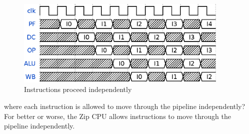 \documentclass{gqtekspec}
\begin{document}
\begin{itemize}
\begin{figure}\begin{center}
\includegraphics[width=4in]{../gfx/stuttrb.eps}
\caption{Instructions proceed independently}\label{fig:independent-pipeline}
\end{center}\end{figure}
	where each instruction is allowed to move through the pipeline
	independently?  For better or worse, the Zip CPU allows instructions
	to move through the pipeline independently.


\end{itemize}
\end{document}
